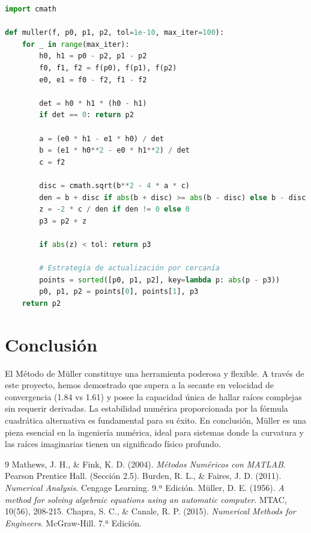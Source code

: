 \documentclass[11pt,a4paper]{article}
\begin{document}
\begin{lstlisting}[language=Python, caption=Núcleo del Algoritmo de Müller]
import cmath

def muller(f, p0, p1, p2, tol=1e-10, max_iter=100):
    for _ in range(max_iter):
        h0, h1 = p0 - p2, p1 - p2
        f0, f1, f2 = f(p0), f(p1), f(p2)
        e0, e1 = f0 - f2, f1 - f2
        
        det = h0 * h1 * (h0 - h1)
        if det == 0: return p2
        
        a = (e0 * h1 - e1 * h0) / det
        b = (e1 * h0**2 - e0 * h1**2) / det
        c = f2
        
        disc = cmath.sqrt(b**2 - 4 * a * c)
        den = b + disc if abs(b + disc) >= abs(b - disc) else b - disc
        z = -2 * c / den if den != 0 else 0
        p3 = p2 + z
        
        if abs(z) < tol: return p3
        
        # Estrategia de actualización por cercanía
        points = sorted([p0, p1, p2], key=lambda p: abs(p - p3))
        p0, p1, p2 = points[0], points[1], p3
    return p2
\end{lstlisting}

\section{Conclusión}
El Método de Müller constituye una herramienta poderosa y flexible. A través de este proyecto, hemos demostrado que supera a la secante en velocidad de convergencia (1.84 vs 1.61) y posee la capacidad única de hallar raíces complejas sin requerir derivadas. La estabilidad numérica proporcionada por la fórmula cuadrática alternativa es fundamental para su éxito. En conclusión, Müller es una pieza esencial en la ingeniería numérica, ideal para sistemas donde la curvatura y las raíces imaginarias tienen un significado físico profundo.

\begin{thebibliography}{9}
  Mathews, J. H., \& Fink, K. D. (2004).
  \textit{Métodos Numéricos con MATLAB}.
  Pearson Prentice Hall. (Sección 2.5).
  Burden, R. L., \& Faires, J. D. (2011).
  \textit{Numerical Analysis}.
  Cengage Learning. 9.ª Edición.
  Müller, D. E. (1956). 
  \textit{A method for solving algebraic equations using an automatic computer}. 
  MTAC, 10(56), 208-215.
  Chapra, S. C., \& Canale, R. P. (2015). 
  \textit{Numerical Methods for Engineers}. 
  McGraw-Hill. 7.ª Edición.
\end{thebibliography}
\end{document}
